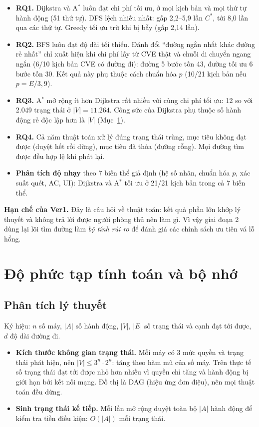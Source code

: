 \documentclass[11pt,a4paper]{article}
\begin{document}
\begin{itemize}
  \item \textbf{RQ1.} Dijkstra và A$^{*}$ luôn đạt chi phí tối ưu, ở mọi kịch bản và mọi thứ tự hành động (51 thứ tự). DFS lệch nhiều nhất: gấp 2,2--5,9 lần $C^{*}$, tới 8,0 lần qua các thứ tự. Greedy tối ưu trừ khi bị bẫy (gấp 2,14 lần).
  \item \textbf{RQ2.} BFS luôn đạt độ dài tối thiểu. Đánh đổi ``đường ngắn nhất khác đường rẻ nhất'' chỉ xuất hiện khi chi phí lấy từ CVE thật và chuỗi di chuyển ngang ngắn (6/10 kịch bản CVE có đường đi): đường 5 bước tốn 43, đường tối ưu 6 bước tốn 30. Kết quả này phụ thuộc cách chuẩn hóa $p$ (10/21 kịch bản nếu $p = E/3{,}9$).
  \item \textbf{RQ3.} A$^{*}$ mở rộng ít hơn Dijkstra rất nhiều với cùng chi phí tối ưu: 12 so với 2.049 trạng thái ở $|V| = 11.264$. Công sức của Dijkstra phụ thuộc số hành động rẻ độc lập hơn là $|V|$ (Mục~\ref{sec:complexity}).
  \item \textbf{RQ4.} Cả năm thuật toán xử lý đúng trạng thái trùng, mục tiêu không đạt được (duyệt hết rồi dừng), mục tiêu đã thỏa (đường rỗng). Mọi đường tìm được đều hợp lệ khi phát lại.
  \item \textbf{Phân tích độ nhạy} theo 7 biến thể giả định (hệ số nhân, chuẩn hóa $p$, xác suất quét, AC, UI): Dijkstra và A$^{*}$ tối ưu ở 21/21 kịch bản trong cả 7 biến thể.
\end{itemize}

\textbf{Hạn chế của Ver1.} Đây là câu hỏi về thuật toán: kết quả phần lớn khớp lý thuyết và không trả lời được người phòng thủ nên làm gì. Vì vậy giai đoạn 2 dùng lại lõi tìm đường làm \emph{bộ tính rủi ro} để đánh giá các chính sách ưu tiên vá lỗ hổng.

\section{Độ phức tạp tính toán và bộ nhớ}
\label{sec:complexity}

\subsection{Phân tích lý thuyết}

Ký hiệu: $n$ số máy, $|A|$ số hành động, $|V|$, $|E|$ số trạng thái và cạnh đạt tới được, $d$ độ dài đường đi.

\begin{itemize}
  \item \textbf{Kích thước không gian trạng thái.} Mỗi máy có 3 mức quyền và trạng thái phát hiện, nên $|V| \le 3^{n} \cdot 2^{n}$: tăng theo hàm mũ của số máy. Trên thực tế số trạng thái đạt tới được nhỏ hơn nhiều vì quyền chỉ tăng và hành động bị giới hạn bởi kết nối mạng. Đồ thị là DAG (hiệu ứng đơn điệu), nên mọi thuật toán đều dừng.
  \item \textbf{Sinh trạng thái kế tiếp.} Mỗi lần mở rộng duyệt toàn bộ $|A|$ hành động để kiểm tra tiền điều kiện: $O(|A|)$ mỗi trạng thái.
\end{itemize}
\end{document}
